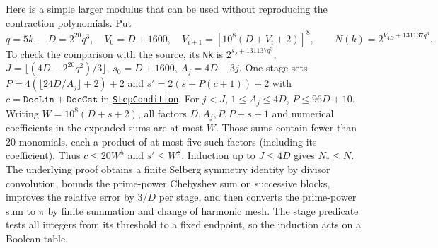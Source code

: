 Here is a simple larger modulus that can be used without reproducing the contraction polynomials. Put
\[
 q=5k,\quad D=2^{20}q^3,\quad V_0=D+1600,\quad
 V_{i+1}=[10^8(D+V_i+2)]^8,\qquad
 N(k)=2^{V_{4D}+131137q^3}.
\]
To check the comparison with the source, its \texttt{Nk} is $2^{s_J+131137q^3}$, $J=\lfloor(4D-2^{20}q^2)/3\rfloor$, $s_0=D+1600$, $A_j=4D-3j$. One stage sets $P=4(\lfloor24D/A_j\rfloor+2)+2$ and $s'=2(s+P(c+1))+2$ with $c=\texttt{DecLin}+\texttt{DecCst}$ in \href{https://github.com/VladimirReshetnikov/ProveIt/blob/a9c0f1949be61679ed2e219b97dc42ecb7ae91a9/Logic/PrimitiveRecursiveArithmetic/Derivations/Lean/IPRADerivations/AnalyticNumberTheory/StepCondition.lean}{\texttt{StepCondition}}. For $j<J$, $1\le A_j\le4D$, $P\le96D+10$. Writing $W=10^8(D+s+2)$, all factors $D,A_j,P,P+s+1$ and numerical coefficients in the expanded sums are at most $W$. Those sums contain fewer than 20 monomials, each a product of at most five such factors (including its coefficient). Thus $c\le20W^5$ and $s'\le W^8$. Induction up to $J\le4D$ gives $N_*\le N$. The underlying proof obtains a finite Selberg symmetry identity by divisor convolution, bounds the prime-power Chebyshev sum on successive blocks, improves the relative error by $3/D$ per stage, and then converts the prime-power sum to $\pi$ by finite summation and change of harmonic mesh. The stage predicate tests all integers from its threshold to a fixed endpoint, so the induction acts on a Boolean table.

